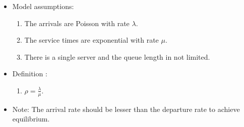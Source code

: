 \documentclass[11pt]{article}
\providecommand{\tightlist}{%
      \setlength{\itemsep}{0pt}\setlength{\parskip}{0pt}}
\begin{document}
\begin{itemize}
\tightlist
\item
  Model assumptions:

  \begin{enumerate}
  \def\labelenumi{\arabic{enumi}.}
  \tightlist
  \item
    The arrivals are Poisson with rate \(\lambda\).
  \item
    The service times are exponential with rate \(\mu\).
  \item
    There is a single server and the queue length in not limited.
  \end{enumerate}
\item
  Definition :

  \begin{enumerate}
  \def\labelenumi{\arabic{enumi}.}
  \tightlist
  \item
    \(\rho = \frac{\lambda}{\mu}\).
  \end{enumerate}
\item
  Note: The arrival rate should be lesser than the departure rate to
  achieve equilibrium.
\end{itemize}
\end{document}
